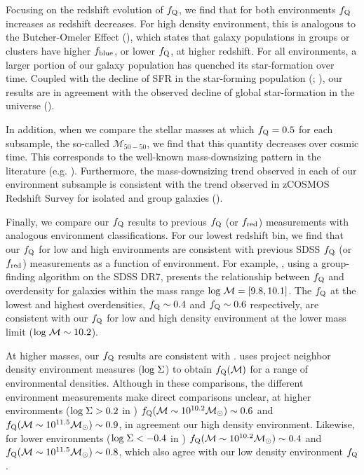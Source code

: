 \documentclass{emulateapj}
\begin{document}
Focusing on the redshift evolution of $f_{\rm{Q}}$, we find that for both environments $f_{\rm{Q}}$ increases as redshift decreases. For high density environment, this is analogous to the Butcher-Omeler Effect (\cite{Butcher:1984aa}), which states that galaxy populations in groups or clusters have higher $f_{\rm{blue}}$, or lower $f_{\rm{Q}}$, at higher redshift. For all environments, a larger portion of our galaxy population has quenched its star-formation over time. Coupled with the decline of SFR in the star-forming population (\cite{Noeske:2007aa}; \cite{cooper08a}), our results are in agreement with the observed decline of global star-formation in the universe (\cite{hopkins06a}). %

In addition, when we compare the stellar masses at which $f_{\rm{Q}} = 0.5$ for each subsample, the so-called $\mathcal{M}_{50-50}$, we find that this quantity decreases over cosmic time. This corresponds to the well-known mass-downsizing pattern in the literature (e.g. \cite{bundy06a}). Furthermore, the mass-downsizing trend observed in each of our environment subsample is consistent with the trend observed in zCOSMOS Redshift Survey for isolated and group galaxies (\cite{Iovino:2010aa}). %

Finally, we compare our $f_{\rm{Q}}$ results to previous $f_{\rm{Q}}$ (or $f_{\rm{red}}$) measurements with analogous environment classifications. For our lowest redshift bin, we find that our $f_{\rm{Q}}$ for low and high environments are consistent with previous SDSS $f_{\rm{Q}}$ (or $f_{\rm{red}}$) measurements as a function of environment. For example, \cite{Tinker:2011aa}, using a group-finding algorithm on the SDSS DR7, presents the relationship between $f_{\rm{Q}}$ and overdensity for galaxies within the mass range $\rm{log} \; \mathcal{M} = [9.8, 10.1]$. The \cite{Tinker:2011aa} $f_{\rm{Q}}$ at the lowest and highest overdensities, $f_{\rm{Q}} \sim 0.4$ and $f_{\rm{Q}} \sim 0.6$ respectively, are consistent with our $f_{\rm{Q}}$ for low and high density environment at the lower mass limit ($\rm{log} \; \mathcal{M} \sim 10.2$). 

At higher masses, our $f_{\rm{Q}}$ results are consistent with \cite{Baldry:2006aa}. \cite{Baldry:2006aa} uses project neighbor density environment measures ($\rm{log} \;  \Sigma$) to obtain $f_{\rm{Q}}(\mathcal{M})$ for a range of environmental densities. Although in these comparisons, the different environment measurements make direct comparisons unclear, at higher environments ($\rm{log} \; \Sigma > 0.2$ in \cite{Baldry:2006aa}) $f_{\rm{Q}}(\mathcal{M} \sim 10^{10.2} \mathcal{M}_{\odot}) \sim 0.6$ and $f_{\rm{Q}}(\mathcal{M} \sim 10^{11.5} \mathcal{M}_{\odot}) \sim 0.9$, in agreement our high density environment. Likewise, for lower environments ($\rm{log} \; \Sigma < -0.4$ in \cite{Baldry:2006aa}) $f_{\rm{Q}}(\mathcal{M} \sim 10^{10.2} \mathcal{M}_{\odot}) \sim 0.4$ and $f_{\rm{Q}}(\mathcal{M} \sim 10^{11.5} \mathcal{M}_{\odot}) \sim 0.8$, which also agree with our low density environment $f_{\rm{Q}}$. 
\end{document}
